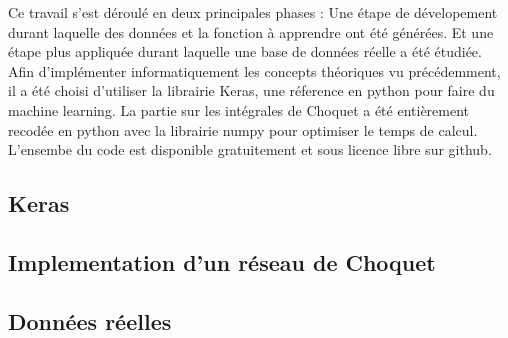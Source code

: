 Ce travail s'est déroulé en deux principales phases :
Une étape de dévelopement durant laquelle des données et la fonction à apprendre ont été générées.
Et une étape plus appliquée durant laquelle une base de données réelle a été étudiée.\\


Afin d'implémenter informatiquement les concepts théoriques vu précédemment,
il a été choisi d'utiliser la librairie Keras\cite{keras}, une réference en python pour faire du machine learning.
La partie sur les intégrales de Choquet a été entièrement recodée en python
avec la librairie numpy\cite{numpy} pour optimiser le temps de calcul.
L'ensembe du code est disponible gratuitement et sous licence libre sur github\cite{repoStage}.

\subsection{Keras}\label{subsec:keras}


\newpage
\subsection{Implementation d'un réseau de Choquet}\label{subsec:implementation-Choquet}


\newpage
\subsection{Données réelles}\label{subsec:données-réelles}


